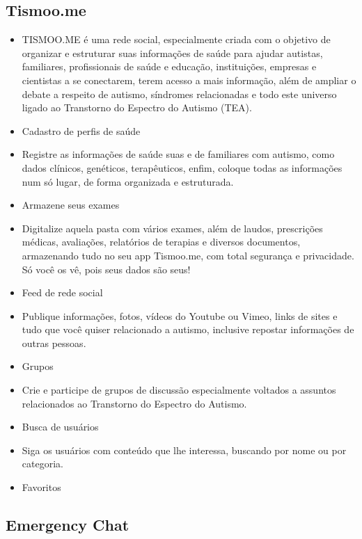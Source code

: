 \subsection{Tismoo.me}

\begin{itemize}
    \item TISMOO.ME é uma rede social, especialmente criada com o objetivo de organizar e estruturar suas informações de saúde para ajudar autistas, familiares, profissionais de saúde e educação, instituições, empresas e cientistas a se conectarem, terem acesso a mais informação, além de ampliar o debate a respeito de autismo, síndromes relacionadas e todo este universo ligado ao Transtorno do Espectro do Autismo (TEA).
    \item Cadastro de perfis de saúde
    \item Registre as informações de saúde suas e de familiares com autismo, como dados clínicos, genéticos, terapêuticos, enfim, coloque todas as informações num só lugar, de forma organizada e estruturada.
    \item Armazene seus exames
    \item Digitalize aquela pasta com vários exames, além de laudos, prescrições médicas, avaliações, relatórios de terapias e diversos documentos, armazenando tudo no seu app Tismoo.me, com total segurança e privacidade. Só você os vê, pois seus dados são seus!
    \item Feed de rede social
    \item Publique informações, fotos, vídeos do Youtube ou Vimeo, links de sites e tudo que você quiser relacionado a autismo, inclusive repostar informações de outras pessoas.
    \item Grupos
    \item Crie e participe de grupos de discussão especialmente voltados a assuntos relacionados ao Transtorno do Espectro do Autismo.
    \item Busca de usuários
    \item Siga os usuários com conteúdo que lhe interessa, buscando por nome ou por categoria.
    \item Favoritos
\end{itemize}

\subsection{Emergency Chat}

